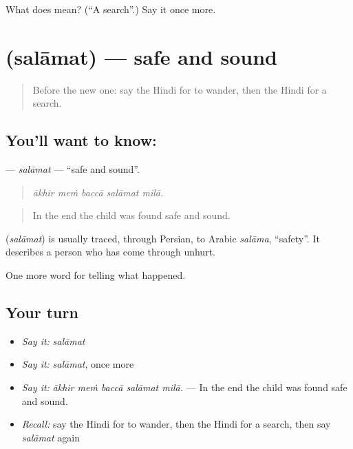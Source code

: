 \begin{tcolorbox}[breakable,colback=teal!4,colframe=teal!35!black,title={Before you move on}]
What does  mean? (\textquotedblleft{}A search\textquotedblright{}.) Say it once more.
\end{tcolorbox}
\section[\texorpdfstring{\hi{सलामत} (salāmat)}{सलामत (salāmat)}]{ (salāmat) — safe and sound}

\label{lesson:HI-C310-salamat}



\begin{quote}
Before the new one: say the Hindi for to wander, then the Hindi for a search.
\end{quote}

\subsection*{You'll want to know: }
\textbf{} — \emph{salāmat} — \textquotedblleft{}safe and sound\textquotedblright{}.

\begin{quote}
    
\end{quote}

\begin{quote}
\emph{ākhir meṁ baccā salāmat milā.}
\end{quote}

\begin{quote}
In the end the child was found safe and sound.
\end{quote}

\begin{cousinweb}
\textbf{} (\emph{salāmat}) is usually traced, through Persian, to Arabic \emph{salāma}, \textquotedblleft{}safety\textquotedblright{}. It describes a person who has come through unhurt.
\end{cousinweb}

\begin{grammarlens}[title={What you've built}]
One more word for telling what happened.
\end{grammarlens}

\subsection*{Your turn}
\begin{itemize}
\raggedright
  \item \emph{Say it:} \emph{salāmat}
  \item \emph{Say it:} \emph{salāmat}, once more
  \item \emph{Say it:} \emph{ākhir meṁ baccā salāmat milā.} — In the end the child was found safe and sound.
  \item \emph{Recall:} say the Hindi for to wander, then the Hindi for a search, then say \emph{salāmat} again
\end{itemize}

